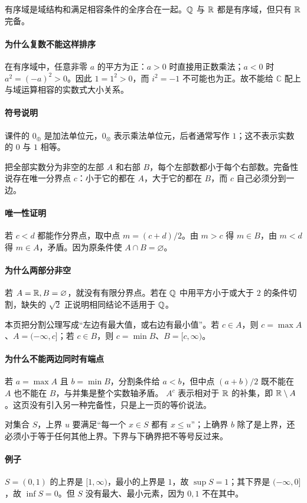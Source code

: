 有序域是域结构和满足相容条件的全序合在一起。$\mathbb{Q}$ 与 $\mathbb{R}$ 都是有序域，但只有 $\mathbb{R}$ 完备。
\paragraph{为什么复数不能这样排序}在有序域中，任意非零 $a$ 的平方为正：$a>0$ 时直接用正数乘法；$a<0$ 时 $a^2=(-a)^2>0$。因此 $1=1^2>0$，而 $i^2=-1$ 不可能也为正。故不能给 $\mathbb C$ 配上与域运算相容的实数式大小关系。
\paragraph{符号说明}课件的 $0_\oplus$ 是加法单位元，$0_\otimes$ 表示乘法单位元，后者通常写作 $1$；这不表示实数的 $0$ 与 $1$ 相等。

把全部实数分为非空的左部 $A$ 和右部 $B$，每个左部数都小于每个右部数。完备性说存在唯一分界点 $c$：小于它的都在 $A$，大于它的都在 $B$，而 $c$ 自己必须分到一边。
\paragraph{唯一性证明}若 $c<d$ 都能作分界点，取中点 $m=(c+d)/2$。由 $m>c$ 得 $m\in B$，由 $m<d$ 得 $m\in A$，矛盾。因为原条件使 $A\cap B=\varnothing$。
\paragraph{为什么两部分非空}若 $A=\mathbb{R},B=\varnothing$，就没有有限分界点。若在 $\mathbb{Q}$ 中用平方小于或大于 $2$ 的条件切割，缺失的 $\sqrt2$ 正说明相同结论不适用于 $\mathbb{Q}$。

本页把分割公理写成“左边有最大值，或右边有最小值”。若 $c\in A$，则 $c=\max A$、$A=(-\infty,c]$；若 $c\in B$，则 $c=\min B$、$B=[c,\infty)$。
\paragraph{为什么不能两边同时有端点}若 $a=\max A$ 且 $b=\min B$，分割条件给 $a<b$，但中点 $(a+b)/2$ 既不能在 $A$ 也不能在 $B$，与并集是整个实数轴矛盾。
$A^c$ 表示相对于 $\mathbb{R}$ 的补集，即 $\mathbb{R}\setminus A$。这页没有引入另一种完备性，只是上一页的等价说法。

对集合 $S$，上界 $u$ 要满足“每一个 $x\in S$ 都有 $x\le u$”；上确界 $b$ 除了是上界，还必须小于等于任何其他上界。下界与下确界把不等号反过来。
\paragraph{例子}$S=(0,1)$ 的上界是 $[1,\infty)$，最小的上界是 $1$，故 $\sup S=1$；其下界是 $(-\infty,0]$，故 $\inf S=0$。但 $S$ 没有最大、最小元素，因为 $0,1$ 不在其中。
